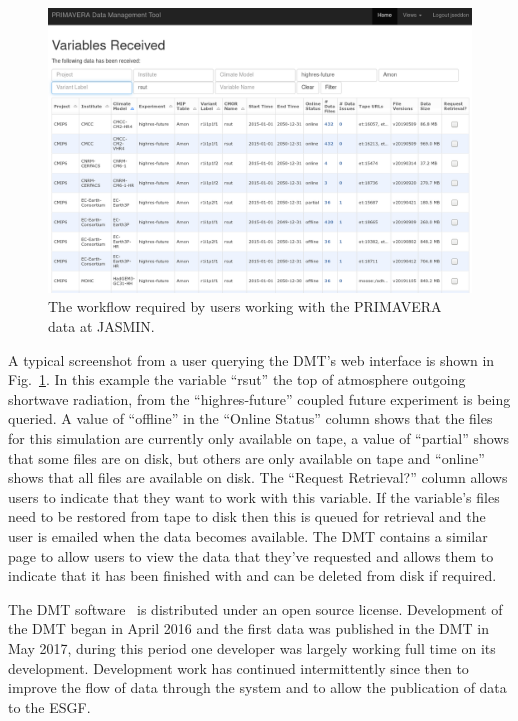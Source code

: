 \documentclass[gmd, manuscript]{copernicus}
\begin{document}
\begin{figure}[t]
	\includegraphics[width=12cm]{fig03.png}
	\caption{The workflow required by users working with the PRIMAVERA data at JASMIN.}
	\label{dmt_query}
\end{figure}

A typical screenshot from a user querying the DMT's web interface is shown in Fig.~\ref{dmt_query}. In this example the variable ``rsut'' the top of atmosphere outgoing shortwave radiation, from the ``highres-future'' coupled future experiment is being queried. A value of ``offline'' in the ``Online Status'' column shows that the files for this simulation are currently only available on tape, a value of ``partial'' shows that some files are on disk, but others are only available on tape and ``online'' shows that all files are available on disk. The ``Request Retrieval?'' column allows users to indicate that they want to work with this variable. If the variable's files need to be restored from tape to disk then this is queued for retrieval and the user is emailed when the data becomes available. The DMT contains a similar page to allow users to view the data that they've requested and allows them to indicate that it has been finished with and can be deleted from disk if required.

The DMT software~\citep{Seddon2019} is distributed under an open source license. Development of the DMT began in April 2016 and the first data was published in the DMT in May 2017, during this period one developer was largely working full time on its development. Development work has continued intermittently since then to improve the flow of data through the system and to allow the publication of data to the ESGF. 
\end{document}
